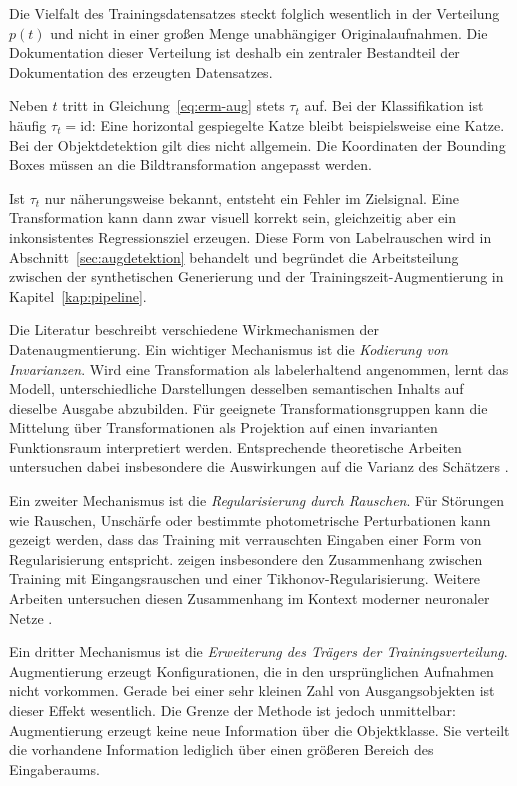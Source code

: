 Die Vielfalt des Trainingsdatensatzes steckt folglich wesentlich in der Verteilung $p(t)$ und nicht in einer großen Menge unabhängiger Originalaufnahmen. Die Dokumentation dieser Verteilung ist deshalb ein zentraler Bestandteil der Dokumentation des erzeugten Datensatzes.

Neben $t$ tritt in Gleichung~\eqref{eq:erm-aug} stets $\tau_t$ auf. Bei der Klassifikation ist häufig $\tau_t=\mathrm{id}$: Eine horizontal gespiegelte Katze bleibt beispielsweise eine Katze. Bei der Objektdetektion gilt dies nicht allgemein. Die Koordinaten der Bounding Boxes müssen an die Bildtransformation angepasst werden.

Ist $\tau_t$ nur näherungsweise bekannt, entsteht ein Fehler im Zielsignal. Eine Transformation kann dann zwar visuell korrekt sein, gleichzeitig aber ein inkonsistentes Regressionsziel erzeugen. Diese Form von Labelrauschen wird in Abschnitt~\ref{sec:augdetektion} behandelt und begründet die Arbeitsteilung zwischen der synthetischen Generierung und der Trainingszeit-Augmentierung in Kapitel~\ref{kap:pipeline}.

Die Literatur beschreibt verschiedene Wirkmechanismen der Datenaugmentierung. Ein wichtiger Mechanismus ist die \emph{Kodierung von Invarianzen}. Wird eine Transformation als labelerhaltend angenommen, lernt das Modell, unterschiedliche Darstellungen desselben semantischen Inhalts auf dieselbe Ausgabe abzubilden. Für geeignete Transformationsgruppen kann die Mittelung über Transformationen als Projektion auf einen invarianten Funktionsraum interpretiert werden. Entsprechende theoretische Arbeiten untersuchen dabei insbesondere die Auswirkungen auf die Varianz des Schätzers \parencite{chen2020group}.

Ein zweiter Mechanismus ist die \emph{Regularisierung durch Rauschen}. Für Störungen wie Rauschen, Unschärfe oder bestimmte photometrische Perturbationen kann gezeigt werden, dass das Training mit verrauschten Eingaben einer Form von Regularisierung entspricht. \textcite{bishop1995} zeigen insbesondere den Zusammenhang zwischen Training mit Eingangsrauschen und einer Tikhonov-Regularisierung. Weitere Arbeiten untersuchen diesen Zusammenhang im Kontext moderner neuronaler Netze \parencite{dao2019}.

Ein dritter Mechanismus ist die \emph{Erweiterung des Trägers der Trainingsverteilung}. Augmentierung erzeugt Konfigurationen, die in den ursprünglichen Aufnahmen nicht vorkommen. Gerade bei einer sehr kleinen Zahl von Ausgangsobjekten ist dieser Effekt wesentlich. Die Grenze der Methode ist jedoch unmittelbar: Augmentierung erzeugt keine neue Information über die Objektklasse. Sie verteilt die vorhandene Information lediglich über einen größeren Bereich des Eingaberaums.

